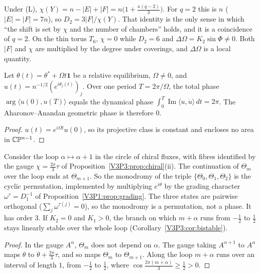\begin{remark}\label{V3P3:rem:euler}
Under (L), $\chi(Y)=n-|E|+|F|=n\bigl(1+\frac{\kappa(q-2)}{3}\bigr)$. For $q=2$ this is $n$
($|E|=|F|=7n$), so $D_2=3|F|/\chi(Y)$. That identity is the only sense in which ``the shift
is set by $\chi$ and the number of chambers'' holds, and it is a coincidence of $q=2$. On the
thin torus $T_6$, $\chi=0$ while $D_2=6$ and $\Delta\Omega=K_2\sin\Phi\ne0$. Both $|F|$ and
$\chi$ are multiplied by the degree under coverings, and $\Delta\Omega$ is a local
quantity.
\end{remark}

\begin{proposition}\label{V3P3:prop:berry}
Let $\theta(t)=\theta^{*}+\Omega t\mathbf 1$ be a relative equilibrium, $\Omega\ne0$, and
$u(t)=n^{-1/2}(e^{i\theta_j(t)})_j$. Over one period $T=2\pi/\Omega$, the total phase
$\arg\langle u(0),u(T)\rangle$ equals the dynamical phase
$\int_0^{T}\operatorname{Im}\langle u,\dot u\rangle\,dt=2\pi$. The Aharonov--Anandan
geometric phase is therefore $0$.
\end{proposition}

\begin{proof}
$u(t)=e^{i\Omega t}u(0)$, so its projective class is constant and encloses no area in
$\mathbb{C}\mathbb{P}^{n-1}$.
\end{proof}

\begin{proposition}\label{V3P3:prop:monodromy}
Consider the loop $\alpha\mapsto\alpha+1$ in the circle of chiral fluxes, with fibres
identified by the gauge $\chi=\frac{2\pi}3\tau$ of
Proposition~\ref{V3P3:prop:chiral}(ii). The continuation of $\Theta_m$ over the loop ends at
$\Theta_{m+1}$. So the monodromy of the triple $\{\Theta_0,\Theta_1,\Theta_2\}$ is the cyclic
permutation, implemented by multiplying $e^{i\theta}$ by the grading character
$\omega^{\tau}=D_1^{-1}$ of Proposition~\ref{V3P1:prop:grading}. The three states are
pairwise orthogonal ($\sum_j\omega^{\tau(j)}=0$), so the monodromy is a permutation, not a
phase. It has order $3$. If $K_2=0$ and $K_1>0$, the branch on which $m+\alpha$ runs from
$-\frac12$ to $\frac12$ stays linearly stable over the whole loop
(Corollary~\ref{V3P3:cor:bistable}).
\end{proposition}

\begin{proof}
In the gauge $A^{\alpha}$, $\Theta_m$ does not depend on $\alpha$. The gauge taking
$A^{\alpha+1}$ to $A^{\alpha}$ maps $\theta$ to $\theta+\frac{2\pi}3\tau$, and so maps
$\Theta_m$ to $\Theta_{m+1}$. Along the loop $m+\alpha$ runs over an interval of length
$1$, from $-\frac12$ to $\frac12$, where $\cos\frac{2\pi(m+\alpha)}{3}\ge\frac12>0$.
\end{proof}

